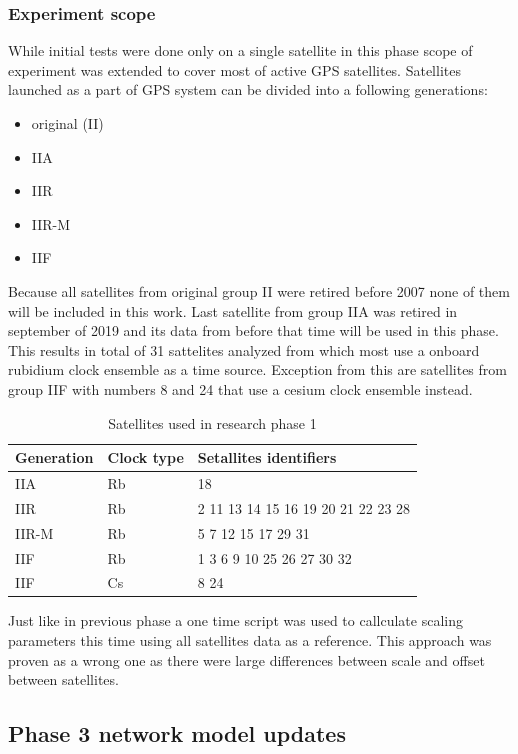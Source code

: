 \subsubsection{Experiment scope}
While initial tests were done only on a single satellite in this phase scope of experiment
was extended to cover most of active GPS satellites.
Satellites launched as a part of GPS system can be divided into a following generations:
\begin{itemize}
	\item original (II)
	\item IIA
	\item IIR
	\item IIR-M
	\item IIF
\end{itemize}
Because all satellites from original group II were retired before 2007 none of them will be 
included in this work. Last satellite from group IIA was retired in september of 2019 and its
data from before that time will be used in this phase.
This results in total of 31 sattelites analyzed from which most use a onboard rubidium clock
ensemble as a time source. Exception from this are satellites from group IIF with numbers 
8 and 24 that use a cesium clock ensemble instead.
\begin{table}[ht] 
	\centering
	\caption{Satellites used in research phase 1}
	\label{tab:sats_phase_1}
	\begin{tabular}{lll}
		\hline
		\hline
		Generation& Clock type& Setallites identifiers  \\
		\hline
		IIA& Rb& 18\\
		IIR& Rb& 2 11 13 14 15 16 19 20 21 22 23 28\\
		IIR-M& Rb& 5 7 12 15 17 29 31\\
		IIF& Rb& 1 3 6 9 10 25 26 27 30 32\\
		IIF& Cs& 8 24\\
		\hline
		\hline
	\end{tabular}
\end{table}
Just like in previous phase a one time script was used to callculate scaling parameters this 
time using all satellites data as a reference. This approach was proven as a wrong one as 
there were large differences between scale and offset between satellites.

\subsection{Phase 3 network model updates}


